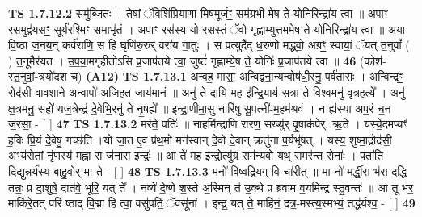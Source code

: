 \documentclass[17pt]{extarticle}
\begin{document}
                  \newline
                                \textbf{ TS 1.7.12.2} \newline
                  समु॑ब्जितः । तेषां॒ ॅविशि॑प्रियाणा॒-मिष॒मूर्जꣳ॒॒ सम॑ग्रभी-मे॒ष ते॒ योनि॒रिन्द्रा॑य त्वा ॥ अ॒पाꣳ रस॒मुद्व॑यसꣳ॒॒ सूर्य॑रश्मिꣳ स॒माभृ॑तं । अ॒पाꣳ रस॑स्य॒ यो रस॒स्तं ॅवो॑ गृह्णाम्युत्त॒ममे॒ष ते॒ योनि॒रिन्द्रा॑य त्वा ॥ अ॒या वि॒ष्ठा ज॒नय॒न् कर्व॑राणि॒ स हि घृणि॑रु॒रुर् वरा॑य गा॒तुः । स प्रत्युदै᳚द् ध॒रुणो मद्ध्वो॒ अग्रꣳ॒॒ स्वायां॒ ॅयत् त॒नुवां᳚ ( ) त॒नूमैर॑यत । उ॒प॒या॒मगृ॑हीतोऽसि प्र॒जाप॑तये त्वा॒ जुष्टं॑ गृह्णाम्ये॒ष ते॒ योनिः॑ प्र॒जाप॑तये त्वा ॥ \textbf{  46 } \newline
                  \newline
                      (कोश॑-स्त॒नुवां॒-त्रयो॑दश च)  \textbf{(A12)} \newline \newline
                                        \textbf{ TS 1.7.13.1} \newline
                  अन्वह॒ मासा॒ अन्विद्वना॒न्यन्वोष॑धी॒रनु॒ पर्व॑तासः । अन्विन्द्रꣳ॒॒ रोद॑सी वावशा॒ने अन्वापो॑ अजिहत॒ जाय॑मानं ॥ अनु॑ ते दायि म॒ह इ॑न्द्रि॒याय॑ स॒त्रा ते॒ विश्व॒मनु॑ वृत्र॒हत्ये᳚ । अनु॑ क्ष॒त्रमनु॒ सहो॑ यज॒त्रेन्द्र॑ दे॒वेभि॒रनु॑ ते नृ॒षह्ये᳚ ॥ इ॒न्द्रा॒णीमा॒सु नारि॑षु सु॒पत्नी॑-म॒हम॑श्रवं । न ह्य॑स्या अप॒रं च॒न ज॒रसा॒ - [ ] \textbf{  47} \newline
                  \newline
                                \textbf{ TS 1.7.13.2} \newline
                  मर॑ते॒ पतिः॑ ॥ नाहमि॑न्द्राणि रारण॒ सख्यु॑र् वृ॒षाक॑पेर्. ऋ॒ते । यस्ये॒दमप्यꣳ॑ ह॒विः प्रि॒यं दे॒वेषु॒ गच्छ॑ति ॥यो जा॒त ए॒व प्र॑थ॒मो मन॑स्वान् दे॒वो दे॒वान् क्रतु॑ना प॒र्यभू॑षत् । यस्य॒ शुष्मा॒द्रोद॑सी॒ अभ्य॑सेतां नृं॒णस्य॑ म॒ह्ना स ज॑नास॒ इन्द्रः॑ ॥ आ ते॑ म॒ह इ॑न्द्रो॒त्यु॑ग्र॒ सम॑न्यवो॒ यथ् स॒मर॑न्त॒ सेनाः᳚ । पता॑ति दि॒द्युन्नर्य॑स्य बाहु॒वोर् मा ते॒ - [ ] \textbf{  48} \newline
                  \newline
                                \textbf{ TS 1.7.13.3} \newline
                  मनो॑ विष्व॒द्रिय॒ग् वि चा॑रीत् ॥ मा नो॑ मर्द्धी॒रा भ॑रा द॒द्धि तन्नः॒ प्र दा॒शुषे॒ दात॑वे॒ भूरि॒ यत् ते᳚ । नव्ये॑ दे॒ष्णे श॒स्ते अ॒स्मिन् त॑ उ॒क्थे प्र ब्र॑वाम व॒यमि॑न्द्र स्तु॒वन्तः॑ ॥ आ तू भ॑र॒ माकि॑रे॒तत् परि॑ ष्ठाद् वि॒द्मा हि त्वा॒ वसु॑पतिं॒ ॅवसू॑नां । इन्द्र॒ यत् ते॒ माहि॑नं॒ दत्र॒-मस्त्य॒स्मभ्यं॒ तद्ध॑र्यश्व॒ - [ ] \textbf{  49} \newline
\end{document}
